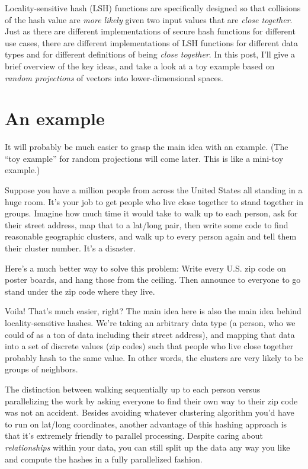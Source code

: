 \documentclass[20pt,]{extarticle}
\begin{document}
Locality-sensitive hash (LSH) functions are specifically designed so
that collisions of the hash value are \emph{more likely} given two input
values that are \emph{close together}. Just as there are different
implementations of secure hash functions for different use cases, there
are different implementations of LSH functions for different data types
and for different definitions of being \emph{close together}. In this
post, I'll give a brief overview of the key ideas, and take a look at a
toy example based on \emph{random projections} of vectors into
lower-dimensional spaces.

\section{An example}\label{an-example}

It will probably be much easier to grasp the main idea with an example.
(The ``toy example'' for random projections will come later. This is
like a mini-toy example.)

Suppose you have a million people from across the United States all
standing in a huge room. It's your job to get people who live close
together to stand together in groups. Imagine how much time it would
take to walk up to each person, ask for their street address, map that
to a lat/long pair, then write some code to find reasonable geographic
clusters, and walk up to every person again and tell them their cluster
number. It's a disaster.

Here's a much better way to solve this problem: Write every U.S. zip
code on poster boards, and hang those from the ceiling. Then announce to
everyone to go stand under the zip code where they live.

Voila! That's much easier, right? The main idea here is also the main
idea behind locality-sensitive hashes. We're taking an arbitrary data
type (a person, who we could of as a ton of data including their street
address), and mapping that data into a set of discrete values (zip
codes) such that people who live close together probably hash to the
same value. In other words, the clusters are very likely to be groups of
neighbors.

The distinction between walking sequentially up to each person versus
parallelizing the work by asking everyone to find their own way to their
zip code was not an accident. Besides avoiding whatever clustering
algorithm you'd have to run on lat/long coordinates, another advantage
of this hashing approach is that it's extremely friendly to parallel
processing. Despite caring about \emph{relationships} within your data,
you can still split up the data any way you like and compute the hashes
in a fully parallelized fashion.
\end{document}
